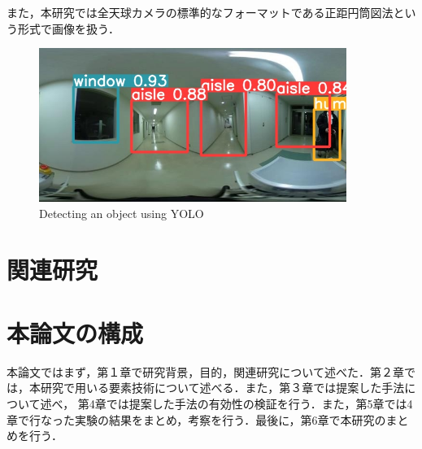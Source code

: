 \documentclass[../main]{subfiles}
\begin{document}
        また，本研究では全天球カメラの標準的なフォーマットである正距円筒図法という形式で画像を扱う．
        
        \begin{figure}[H]
            \centering
            \includegraphics[width=10cm]{../images/yolo_aisle.jpg}
            \caption{Detecting an object using YOLO}
            \label{figure::image_exp}
        \end{figure}
        
        \newpage

        \section{関連研究}
        

        \section{本論文の構成}
        本論文ではまず，第１章で研究背景，目的，関連研究について述べた．第２章では，本研究で用いる要素技術について述べる．また，第３章では提案した手法について述べ，
        第4章では提案した手法の有効性の検証を行う．また，第5章では4章で行なった実験の結果をまとめ，考察を行う．最後に，第6章で本研究のまとめを行う．
\end{document}
